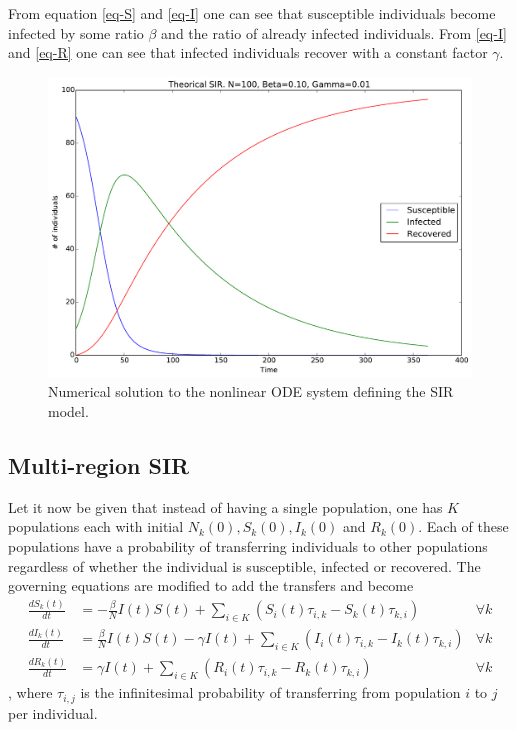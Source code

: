 From equation \eqref{eq-S} and \eqref{eq-I} one can see that susceptible individuals become infected by some ratio $\beta$ and the ratio of already infected individuals. From \eqref{eq-I} and \eqref{eq-R} one can see that infected individuals recover with a constant factor $\gamma$. 

\begin{figure}[H]
	\centering
	\includegraphics[width= 1.0 \linewidth]{plots/sir_one_region.pdf}
	\caption{Numerical solution to the nonlinear ODE system defining the SIR model.}
\end{figure}

\subsection{Multi-region SIR}
Let it now be given that instead of having a single population, one has $K$ populations each with initial $N_k(0), S_k(0), I_k(0)$ and $R_k(0)$. Each of these populations have a probability of transferring individuals to other populations regardless of whether the individual is susceptible, infected or recovered. The governing equations are modified to add the transfers and become
\begin{align}
\frac{d S_k(t)}{dt} &= - \frac{\beta}{N} I(t) S(t) + \sum_{i\in K} \left( S_i(t)\tau_{i,k} - S_k(t)\tau_{k, i}\right)   &\forall k\\
\frac{d I_k(t)}{dt} &= \frac{\beta}{N} I(t) S(t) - \gamma I(t) + \sum_{i\in K} \left( I_i(t)\tau_{i,k} - I_k(t)\tau_{k, i}\right)  &\forall k\\
\frac{d R_k(t)}{dt} &= \gamma I(t) + \sum_{i\in K} \left( R_i(t)\tau_{i,k} - R_k(t)\tau_{k, i}\right) &\forall k
\end{align}
, where $\tau_{i,j}$ is the infinitesimal probability of transferring from population $i$ to $j$ per individual.

